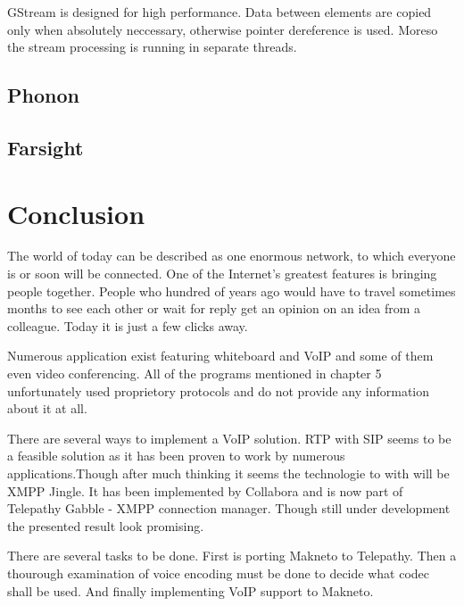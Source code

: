GStream is designed for high performance. Data between elements are copied only when absolutely neccessary, otherwise pointer dereference is used. Moreso the stream processing is running in separate threads.  

\section{Phonon}
\section{Farsight}


\chapter{Conclusion}
The world of today can be described as one enormous network, to which everyone is or soon will be connected. One of the Internet's greatest features is bringing people together. People who hundred of years ago would have to travel sometimes months to see each other or wait for reply get an opinion on an idea from a colleague. Today it is just a few clicks away.

Numerous application exist featuring whiteboard and VoIP and some of them even video conferencing. All of the programs mentioned in chapter 5 unfortunately used proprietory protocols and do not provide any information about it at all. 

There are several ways to implement a VoIP solution. RTP with SIP seems to be a feasible solution as it has been proven to work by numerous applications.Though after much thinking it seems the technologie to with will be XMPP Jingle. It has been implemented by Collabora and is now part of Telepathy Gabble - XMPP connection manager. Though still under development the presented result look promising.

There are several tasks to be done. First is porting Makneto to Telepathy. Then a thourough examination of voice encoding must be done to decide what codec shall be used. And finally implementing VoIP support to Makneto.   



